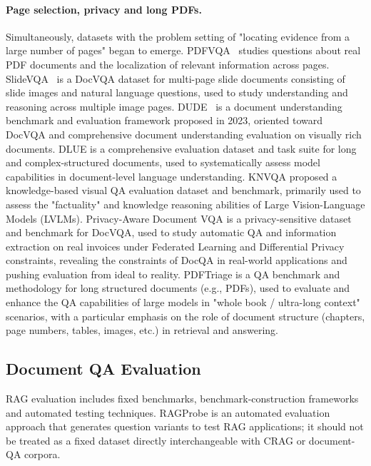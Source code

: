 \paragraph{Page selection, privacy and long PDFs.}
Simultaneously, datasets with the problem setting of "locating evidence from a large number of pages" began to emerge. PDFVQA~\cite{pdfvqa2023} studies questions about real PDF documents and the localization of relevant information across pages. SlideVQA~\cite{slidevqa2023} is a DocVQA dataset for multi-page slide documents consisting of slide images and natural language questions, used to study understanding and reasoning across multiple image pages. DUDE~\cite{dude2023} is a document understanding benchmark and evaluation framework proposed in 2023, oriented toward DocVQA and comprehensive document understanding evaluation on visually rich documents. DLUE \cite{dlue2023} is a comprehensive evaluation dataset and task suite for long and complex-structured documents, used to systematically assess model capabilities in document-level language understanding. KNVQA \cite{knvqa2023} proposed a knowledge-based visual QA evaluation dataset and benchmark, primarily used to assess the "factuality" and knowledge reasoning abilities of Large Vision-Language Models (LVLMs). Privacy-Aware Document VQA \cite{privacydocvqa2023} is a privacy-sensitive dataset and benchmark for DocVQA, used to study automatic QA and information extraction on real invoices under Federated Learning and Differential Privacy constraints, revealing the constraints of DocQA in real-world applications and pushing evaluation from ideal to reality. PDFTriage \cite{saad2024pdftriage} is a QA benchmark and methodology for long structured documents (e.g., PDFs), used to evaluate and enhance the QA capabilities of large models in "whole book / ultra-long context" scenarios, with a particular emphasis on the role of document structure (chapters, page numbers, tables, images, etc.) in retrieval and answering.

\subsection{Document QA Evaluation}

RAG evaluation includes fixed benchmarks, benchmark-construction frameworks and automated testing techniques. RAGProbe \cite{ragprobe2023} is an automated evaluation approach that generates question variants to test RAG applications; it should not be treated as a fixed dataset directly interchangeable with CRAG or document-QA corpora.

